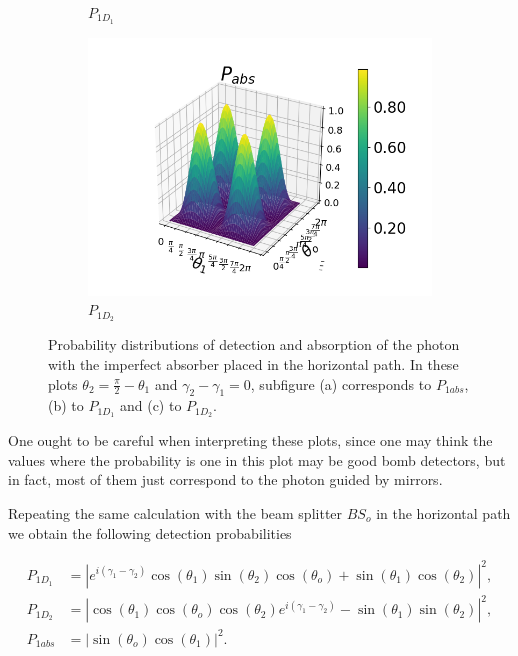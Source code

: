 \documentclass[12pt]{book}
\begin{document}
\begin{figure}[t!]
\begin{subfigure}[b]{0.45\linewidth}
\caption{$P_{1D_{1}}$}
\label{fig:westminster_aerea}
\end{subfigure}
\begin{subfigure}[b]{0.45\linewidth}
\includegraphics[width=\linewidth]{images/PAbs_BS_v.png}
\caption{$P_{1D_{2}}$}
\label{fig:BS1}
\end{subfigure}
\caption{Probability distributions of detection and absorption of the photon with the imperfect absorber placed in the horizontal path. In these plots $\theta_{2}=\frac{\pi}{2}-\theta_{1}$ and $\gamma_{2}-\gamma_{1}=0$, subfigure (a) corresponds to $P_{1abs}$, (b) to $P_{1D_{1}}$ and (c) to $P_{1D_{2}}$.}
\label{P_bs2}
\end{figure}

One ought to be careful when interpreting these plots, since one may think the values where the probability is one in this plot may be good bomb detectors, but in fact, most of them just correspond to the photon guided by mirrors. 

 

Repeating the same calculation with the beam splitter $BS_{o}$ in the horizontal path we obtain the following detection probabilities



\begin{align}
P_{1D_{1}}&=|e^{i(\gamma_{1}-\gamma_{2})}\cos(\theta_{1})\sin(\theta_{2})\cos(\theta_{o})+ \sin(\theta_{1})\cos(\theta_{2})|^2, \\
P_{1D_{2}}&=|\cos(\theta_{1})\cos(\theta_{o})\cos(\theta_{2})e^{i(\gamma_{1}-\gamma_{2})}- \sin(\theta_{1})\sin(\theta_{2})|^2,\\
P_{1abs}&=|\sin(\theta_{o}) \cos(\theta_{1})|^2 .
\end{align}
\end{document}
